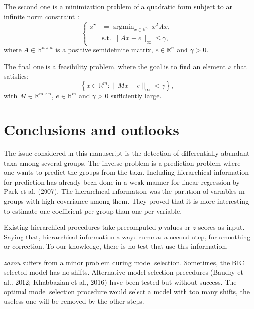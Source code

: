 \documentclass[12pt,a4paper]{reedthesis}
\newcommand \RR {\mathbb{R}}
\DeclareMathOperator*{\argmin}{argmin}
\theoremstyle{definition}
\theoremstyle{definition}
\theoremstyle{definition}
\theoremstyle{remark}
\begin{document}
The second one is a minimization problem of a quadratic form subject to an infinite norm constraint :
\begin{equation*}
\left\{
  \begin{aligned}
    x^\star & = \argmin_{x \in \mathbb{R}^{n}} \ x^TAx, \\
    &\text{s.t. }\|Ax - e\|_{\infty} \leq \gamma,
  \end{aligned}
\right.
\end{equation*}
where \(A \in \RR^{n\times n}\) is a positive semidefinite matrix, \(e\in \RR^n\) and \(\gamma > 0\).

The final one is a feasibility problem, where the goal is to find an element \(x\) that satisfies:
\begin{equation*}
\left\{x \in \RR^m : \|Mx-e\|_{\infty} < \gamma\right\},
\end{equation*}
with \(M \in \RR^{m\times n}\), \(e \in \RR^m\) and \(\gamma > 0\) sufficiently large.

\hypertarget{conclusions-and-outlooks}{%
\section*{Conclusions and outlooks}\label{conclusions-and-outlooks}}

The issue considered in this manuscript is the detection of differentially abundant taxa among several groups. The inverse problem is a prediction problem where one wants to predict the groups from the taxa. Including hierarchical information for prediction has already been done in a weak manner for linear regression by Park et al. (2007). The hierarchical information was the partition of variables in groups with high covariance among them. They proved that it is more interesting to estimate one coefficient per group than one per variable.

Existing hierarchical procedures take precomputed \(p\)-values or \(z\)-scores as input. Saying that, hierarchical information always come as a second step, for smoothing or correction. To our knowledge, there is no test that use this information.

\emph{zazou} suffers from a minor problem during model selection. Sometimes, the BIC selected model has no shifts. Alternative model selection procedures (Baudry et al., 2012; Khabbazian et al., 2016) have been tested but without success. The optimal model selection procedure would select a model with too many shifts, the useless one will be removed by the other steps.
\end{document}
